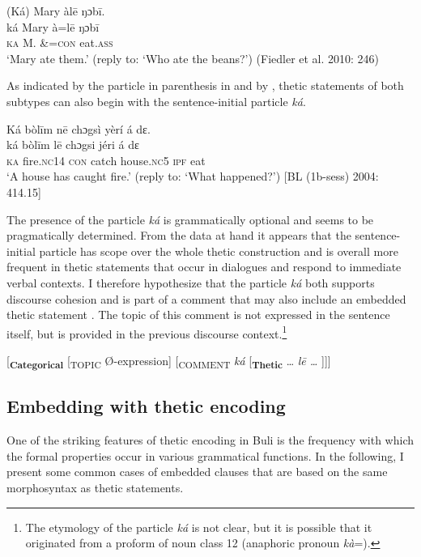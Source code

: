 \documentclass[output=paper]{langsci/langscibook}
\begin{document}
\ea\label{ex:schwarz:25}
\glll  (Ká)  Mary  àl\={e}    ŋɔb\={i}.\\
    \textup{ká}  Mary  à=l\={e}    {ŋɔb\={i}}\\
     \textsc{ka}  M.  \&=\textsc{con}  eat.\textsc{ass}\\
\glt ‘Mary ate them.’ (reply to: ‘Who ate the beans?’) (Fiedler et al. 2010: 246)
\z

As indicated by the particle in parenthesis in  and by , thetic statements of both subtypes can also begin with the sentence-initial particle \textit{ká}. 

\ea\label{ex:schwarz:26}
\glll   Ká  bòl\={i}m    n\={e}  chɔgsì  yèrí    á  dɛ.\\
    \textup{ká}  bòl\={i}m    l\={e}  chɔgsi  jéri    á  {dɛ}\\
     \textsc{  ka}  fire.\textsc{nc}14  \textsc{con}  catch   house.\textsc{nc}5   \textsc{ipf}   eat\\
\glt ‘A house has caught fire.’ (reply to: ‘What happened?’) [BL (1b-sess) 2004: 414.15]
\z

The presence of the particle \textit{ká} is grammatically optional and seems to be pragmatically determined. From the data at hand it appears that the sentence-initial particle has scope over the whole thetic construction and is overall more frequent in thetic statements that occur in dialogues and respond to immediate verbal contexts. I therefore hypothesize that the particle \textit{ká} both supports discourse cohesion and is part of a comment that may also include an embedded thetic statement . The topic of this comment is not expressed in the sentence itself, but is provided in the previous discourse context.\footnote{The etymology of the particle \textit{ká} is not clear, but it is possible that it originated from a proform of noun class 12 (anaphoric pronoun \textit{kà}=).} 

\ea\label{ex:schwarz:27} {}
[\textbf{\textsubscript{Categorical}}\textsubscript{} [\textsubscript{TOPIC} Ø-expression]\textsubscript{} [\textsubscript{COMMENT}\textit{ ká} [\textbf{\textsubscript{Thetic}} … \textit{l\={e} …} ]]]
\z

\subsection{Embedding with thetic encoding}\label{sec:schwarz:3.5}

One of the striking features of thetic encoding in Buli is the frequency with which the formal properties occur in various grammatical functions. In the following, I present some common cases of embedded clauses that are based on the same morphosyntax as thetic statements.
\end{document}
